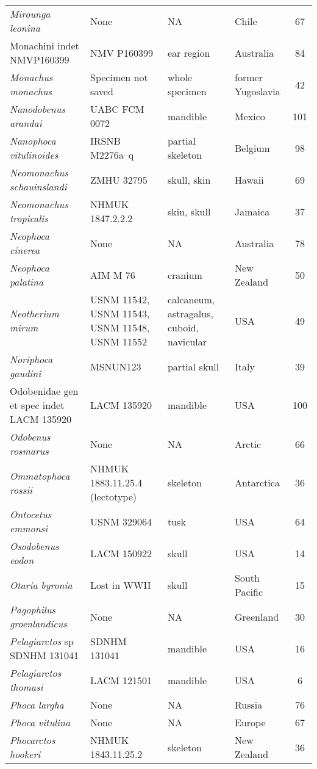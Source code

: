 \begin{longtable}{p{}p{}p{}lc}
\textit{Mirounga leonina} &	None & 	NA & 	Chile & 67\\
Monachini indet NMVP160399	& NMV P160399 & 	ear region & 	Australia & 84\\
\textit{Monachus monachus} &	Specimen not saved & 	whole specimen & 	former Yugoslavia & 42\\
\textit{Nanodobenus arandai} &	UABC FCM 0072 & 	mandible & 	Mexico & 101\\
\textit{Nanophoca vitulinoides} &	IRSNB M2276a–q & 	partial skeleton & 	Belgium & 98\\
\textit{Neomonachus schauinslandi} &	ZMHU 32795 & 	skull, skin & 	Hawaii & 69\\
\textit{Neomonachus tropicalis} &	NHMUK 1847.2.2.2 & 	skin, skull & 	Jamaica & 37\\
\textit{Neophoca cinerea} &	None & 	NA & 	Australia & 78\\
\textit{Neophoca palatina} &	AIM M 76 & 	cranium & 	New Zealand & 50\\
\textit{Neotherium mirum} &	USNM 11542, USNM 11543, USNM 11548, USNM 11552 & calcaneum, astragalus, cuboid, navicular & 	USA & 49\\
\textit{Noriphoca gaudini} & MSNUN123 & 	partial skull & 	Italy & 39\\
Odobenidae gen et spec indet LACM 135920 &	LACM 135920 & 	mandible & 	USA & 100\\
\textit{Odobenus rosmarus} &	None & 	NA & 	Arctic & 66\\
\textit{Ommatophoca rossii} &	NHMUK 1883.11.25.4 (lectotype) & 	skeleton & 	Antarctica & 36\\
\textit{Ontocetus emmonsi} &	USNM 329064 & 	tusk & 	USA & 64\\
\textit{Osodobenus eodon} &	LACM 150922 & 	skull & 	USA & 14\\
\textit{Otaria byronia} &	Lost in WWII & 	skull & 	South Pacific & 15\\
\textit{Pagophilus groenlandicus} &	None & 	NA & 	Greenland & 30\\
\textit{Pelagiarctos} sp SDNHM 131041 &	SDNHM 131041 & 	mandible & 	USA & 16\\
\textit{Pelagiarctos thomasi} &	LACM 121501 & 	mandible & 	USA & 6\\
\textit{Phoca largha} &	None & 	NA & 	Russia	 & 76\\
\textit{Phoca vitulina} &	None & 	NA & 	Europe & 67\\
\textit{Phocarctos hookeri} &	NHMUK 1843.11.25.2 & 	skeleton & 	New Zealand & 36\\

\end{longtable}
